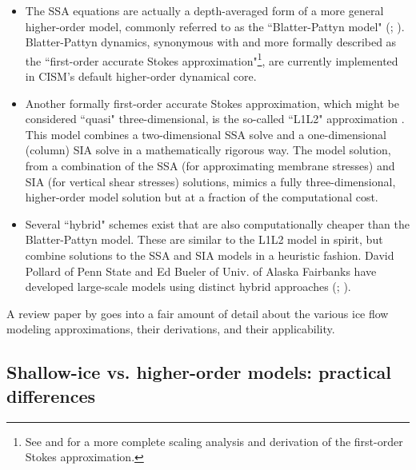 \begin{itemize}
\item The SSA equations are actually a depth-averaged form of a more general higher-order model, commonly referred to as the ``Blatter-Pattyn model" (\citet{BLATTER:1995wz}; \citet{Pattyn:2003tj}). 
Blatter-Pattyn dynamics, synonymous with and more formally described as the ``first-order accurate Stokes approximation"\footnote{See \citet{Schoof:2010dl} and \citet{DUKOWICZ:2010wb} for a more complete scaling analysis and derivation of the first-order Stokes approximation.}, are currently implemented in CISM's default higher-order dynamical core.
\end{itemize}

\begin{itemize}
\item Another formally first-order accurate Stokes approximation, which might be considered ``quasi" three-dimensional, is the so-called ``L1L2" approximation \citep{Schoof:2010dl}. This model combines a two-dimensional SSA solve and a one-dimensional (column) SIA solve in a mathematically rigorous way. The model solution, from a combination of the SSA (for approximating membrane stresses) and SIA (for vertical shear stresses) solutions, mimics a fully three-dimensional, higher-order model solution but at a fraction of the computational cost.
\end{itemize}

\begin{itemize}
\item Several ``hybrid" schemes exist that are also computationally cheaper than the Blatter-Pattyn model. These are similar to the L1L2 model in spirit, but combine solutions to the SSA and SIA models in a heuristic fashion. 
David Pollard of Penn State and Ed Bueler of Univ. of Alaska Fairbanks have developed large-scale models using distinct hybrid approaches (\citet{Bueler:2009ee}; \citet{Pollard:2009ed}).
\end{itemize}

A review paper by \citet{Schoof:2013is} goes into a fair amount of detail about the various ice flow modeling approximations, their derivations, and their applicability.

\subsection{Shallow-ice vs. higher-order models: practical differences}


